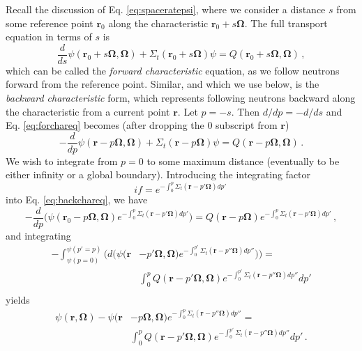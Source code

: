 Recall the discussion of Eq. \ref{eq:spaceratepsi}, where we consider a distance $s$ from some reference point $\mathbf{r}_0$ along the characteristic $\mathbf{r}_0 +s\mathbf{\Omega}$.  The full transport equation in terms of $s$ is 
\begin{equation}
    \frac{d}{ds} \psi(\mathbf{r}_0 +s\mathbf{\Omega},\mathbf{\Omega}) + \Sigma_t(\mathbf{r}_0 +s\mathbf{\Omega})\psi =   Q(\mathbf{r}_0 +s\mathbf{\Omega},\mathbf{\Omega})  \, ,
    \label{eq:forchareq}
\end{equation}
which can be called the \textit{forward characteristic} equation, as we follow neutrons forward from the reference point.  Similar, and which we use below, is the \textit{backward characteristic} form, which represents following neutrons backward along the characteristic from a current point $\mathbf{r}$.  Let $p = -s$.  Then $d/dp = -d/ds$ and Eq. \ref{eq:forchareq} becomes (after dropping the $0$ subscript from $\mathbf{r}$)
\begin{equation}
    -\frac{d}{dp} \psi(\mathbf{r} - p\mathbf{\Omega},\mathbf{\Omega}) + \Sigma_t(\mathbf{r} -p\mathbf{\Omega})\psi =   Q(\mathbf{r} -p\mathbf{\Omega},\mathbf{\Omega})  \, .
    \label{eq:backchareq}
\end{equation}
We wish to integrate from $p=0$ to some maximum distance (eventually to be either infinity or a global boundary).  Introducing the integrating factor
\begin{equation}
 if = e^{ -\int^p_0 \Sigma_t(\mathbf{r} -p'\mathbf{\Omega}) dp'  } \, 
\end{equation}
into Eq. \ref{eq:backchareq}, we have
\begin{equation}
    -\frac{d}{dp} \Big ( \psi(\mathbf{r}_0 - p\mathbf{\Omega},\mathbf{\Omega}) e^{ -\int^p_0 \Sigma_t(\mathbf{r} -p'\mathbf{\Omega}) dp'  } \Big ) =  Q(\mathbf{r} -p\mathbf{\Omega}) e^{ -\int^p_0 \Sigma_t(\mathbf{r} -p'\mathbf{\Omega}) dp'  } \, ,
\end{equation}
and integrating
\begin{equation}
  \begin{split}
    -\int^{\psi(p'=p)}_{\psi(p=0)}  \Bigg(  d \Big ( \psi(\mathbf{r} &- p'\mathbf{\Omega},\mathbf{\Omega})   e^{ -\int^{p'}_0 \Sigma_t(\mathbf{r} -p''\mathbf{\Omega}) dp''  } \Big ) \Bigg ) = \\
   & \int^p_0 Q(\mathbf{r} -p'\mathbf{\Omega},\mathbf{\Omega})e^{ -\int^{p'}_0 \Sigma_t(\mathbf{r} -p''\mathbf{\Omega}) dp''  }dp'   \\
  \end{split}
\end{equation}
yields
\begin{equation}
  \begin{split}
    \psi(\mathbf{r},\mathbf{\Omega}) - \psi(\mathbf{r} &- p\mathbf{\Omega},\mathbf{\Omega})e^{ -\int^{p}_0 \Sigma_t(\mathbf{r} -p''\mathbf{\Omega}) dp''  }  = \\
   & \int^p_0 Q(\mathbf{r} -p'\mathbf{\Omega},\mathbf{\Omega})e^{ -\int^{p'}_0 \Sigma_t(\mathbf{r} -p''\mathbf{\Omega}) dp''  }dp'   \, .
  \end{split}
\end{equation}

